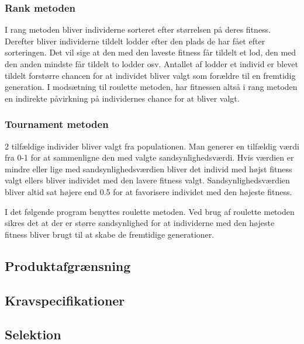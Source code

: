 \subsubsection{Rank metoden}

I rang metoden bliver individerne sorteret efter størrelsen på deres fitness. Derefter bliver individerne tildelt lodder efter den plads de har fået efter sorteringen. Det vil sige at den med den laveste fitness får tildelt et lod, den med den anden mindste får tildelt to lodder osv. Antallet af lodder et individ er blevet tildelt forstørre chancen for at individet bliver valgt som forældre til en fremtidig generation. I modsætning til roulette metoden, har fitnessen altså i rang metoden en indirekte påvirkning på individernes chance for at bliver valgt. 

\subsubsection{Tournament metoden}

2 tilfældige individer bliver valgt fra populationen. Man generer en tilfældig værdi fra 0-1 for at sammenligne den med valgte sandsynlighedsværdi. Hvis værdien er mindre eller lige med sandsynlighedsværdien bliver det individ med højst fitness valgt ellers bliver individet med den lavere fitness valgt. Sandsynlighedsværdien bliver altid sat højere end 0.5 for at favorisere individet med den højeste fitness. 

I det følgende program benyttes roulette metoden. Ved brug af roulette metoden sikres det at der er større sandsynlighed for at individerne med den højeste fitness bliver brugt til at skabe de fremtidige generationer. 

\subsection{Produktafgrænsning}
  

\subsection{Kravspecifikationer}
  

\subsection{Selektion}
  